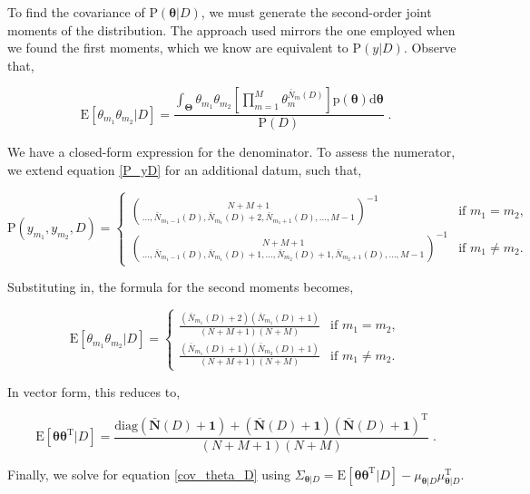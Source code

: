 \documentclass[12pt]{report}
\begin{document}
To find the covariance of $\text{P}(\bm{\theta}|D)$, we must generate the second-order joint moments of the distribution. The approach used mirrors the one employed when we found the first moments, which we know are equivalent to $\text{P}(y|D)$. Observe that,

\begin{equation}
\text{E}[\theta_{m_1} \theta_{m_2} | D] = \frac{\int_{\bm{\Theta}} \theta_{m_1} \theta_{m_2} \left[ \prod_{m=1}^M \theta_m^{\bar{N}_m(D)} \right] \text{p}(\bm{\theta}) \mathrm{d}\bm{\theta}}{\text{P}(D)} \;.
\end{equation}

We have a closed-form expression for the denominator. To assess the numerator, we extend equation \eqref{P_yD} for an additional datum, such that,

\begin{equation}
\text{P}(y_{m_1},y_{m_2},D) = 
\begin{cases}
\binom{N+M+1}{\ldots,\bar{N}_{m_1-1}(D),\bar{N}_{m_1}(D)+2,\bar{N}_{m_1+1}(D),\ldots,M-1}^{-1} & \text{if } m_1 = m_2, \\ 
\binom{N+M+1}{\ldots,\bar{N}_{m_1-1}(D),\bar{N}_{m_1}(D)+1,\ldots,\bar{N}_{m_2}(D)+1,\bar{N}_{m_2+1}(D),\ldots,M-1}^{-1} & \text{if } m_1 \neq m_2.
\end{cases}
\end{equation}

Substituting in, the formula for the second moments becomes,

\begin{equation}
\text{E}[\theta_{m_1} \theta_{m_2} | D] =
\begin{cases}
\frac{(\bar{N}_{m_1}(D)+2)(\bar{N}_{m_1}(D)+1)}{(N+M+1)(N+M)} & \text{if } m_1 = m_2, \\  
\frac{(\bar{N}_{m_1}(D)+1)(\bar{N}_{m_2}(D)+1)}{(N+M+1)(N+M)} & \text{if } m_1 \neq m_2.
\end{cases}
\end{equation}

In vector form, this reduces to,

\begin{equation}
\text{E}[\bm{\theta} \bm{\theta}^\text{T} | D] = \frac{\text{diag}(\bar{\bm{N}}(D) + \bm{1}) + (\bar{\bm{N}}(D) + \bm{1}) (\bar{\bm{N}}(D) + \bm{1})^\text{T}}{(N+M+1)(N+M)} \;.
\end{equation}

Finally, we solve for equation \eqref{cov_theta_D} using $\Sigma_{\bm{\theta} | D} = \text{E}[\bm{\theta} \bm{\theta}^\text{T} | D] -  \mu_{\bm{\theta} | D} \mu_{\bm{\theta} | D}^\text{T}$.
\end{document}
